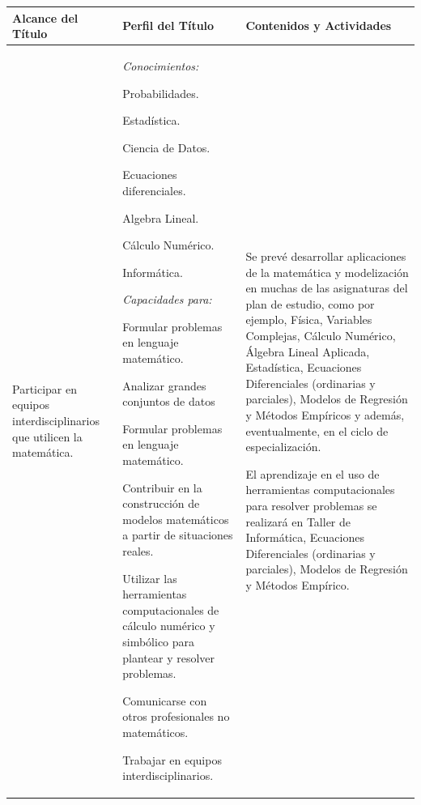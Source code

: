 \documentclass[a4paper, 12pt]{article}
\begin{document}
\begin{center}

\begin{tabularx}{1.0\textwidth}{|>{\raggedright\arraybackslash}X |
>{\raggedright\arraybackslash}X |
>{\raggedright\arraybackslash}X |
}\hline
  \rowcolor[gray]{.9}
  Alcance del Título
  & Perfil del Título
  & Contenidos y Actividades \\ \hline
Participar en equipos interdisciplinarios que utilicen la matemática.
  & \emph{Conocimientos:} 
  
 
 Probabilidades.
    
   Estadística.
   
   Ciencia de Datos.
   
   Ecuaciones diferenciales.
   
   Algebra Lineal. 
   
   Cálculo Numérico. 
   
   Informática.
 
  
  \emph{Capacidades para:} 
    
 
   Formular problemas en lenguaje matemático.
   
    Analizar grandes conjuntos de datos
    
   Formular problemas en lenguaje matemático.
   
   Contribuir en la construcción de modelos matemáticos a partir de situaciones reales.
   
    Utilizar las herramientas computacionales de cálculo numérico y simbólico para plantear y resolver problemas.
    
   Comunicarse con otros profesionales no matemáticos.
   
   Trabajar en equipos interdisciplinarios.
 
  
  
  &

  
 Se prevé desarrollar aplicaciones de la matemática y modelización en muchas de las asignaturas del plan de estudio, como por ejemplo,  Física, Variables Complejas, Cálculo Numérico, Álgebra Lineal Aplicada, Estadística, Ecuaciones Diferenciales (ordinarias y parciales), Modelos de Regresión y Métodos Empíricos y además, eventualmente, en el ciclo de especialización.
  
  El aprendizaje en el uso de herramientas computacionales para resolver problemas se realizará en  Taller de Informática, Ecuaciones Diferenciales (ordinarias y parciales), Modelos de Regresión y Métodos Empírico.
  

\end{tabularx}
\end{center}
\end{document}
